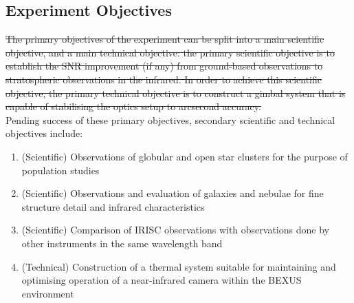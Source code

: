 \subsection{Experiment Objectives}

\st{The primary objectives of the experiment can be split into a main scientific objective, and a main technical objective: the primary scientific objective is to establish the SNR improvement (if any) from ground-based observations to stratospheric observations in the infrared. In order to achieve this scientific objective, the primary technical objective is to construct a gimbal system that is capable of stabilising the optics setup to arcsecond accuracy.}\\

Pending success of these primary objectives, secondary scientific and technical objectives include:
\renewcommand{\labelenumi}{\Roman{enumi}}
\begin{enumerate}
    \item (Scientific) Observations of globular and open star clusters for the purpose of population studies
    \item (Scientific) Observations and evaluation of galaxies and nebulae for fine structure detail and infrared characteristics
    \item (Scientific) Comparison of IRISC observations with observations done by other instruments in the same wavelength band
    \item (Technical) Construction of a thermal system suitable for maintaining and optimising operation of a near-infrared camera within the BEXUS environment
\end{enumerate}
